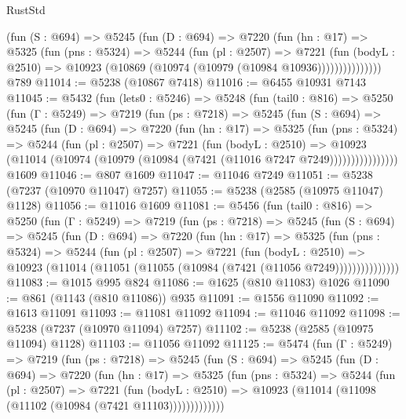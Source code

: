 \begin{lexlean}{RustStd}
\begin{coremodule}
              (fun (S : @694) =>
              @5245
                (fun (D : @694) =>
                @7220
                  (fun (hn : @17) =>
                  @5325
                    (fun (pns : @5324) =>
                    @5244
                      (fun (pl : @2507) =>
                      @7221
                        (fun (bodyL : @2510) =>
                        @10923 (@10869 (@10974 (@10979 (@10984 @10936)))))))))))))))
    @789
@11014 := @5238 (@10867 @7418)
@11016 := @6455 @10931 @7143
@11045 := @5432
    (fun (lets0 : @5246) =>
    @5248
      (fun (tail0 : @816) =>
      @5250
        (fun (Γ : @5249) =>
        @7219
          (fun (ps : @7218) =>
          @5245
            (fun (S : @694) =>
            @5245
              (fun (D : @694) =>
              @7220
                (fun (hn : @17) =>
                @5325
                  (fun (pns : @5324) =>
                  @5244
                    (fun (pl : @2507) =>
                    @7221
                      (fun (bodyL : @2510) =>
                      @10923
                        (@11014 (@10974 (@10979 (@10984 (@7421 (@11016 @7247 @7249))))))))))))))))
    @1609
@11046 := @807 @1609
@11047 := @11046 @7249
@11051 := @5238 (@7237 (@10970 @11047) @7257)
@11055 := @5238 (@2585 (@10975 @11047) @1128)
@11056 := @11016 @1609
@11081 := @5456
    (fun (tail0 : @816) =>
    @5250
      (fun (Γ : @5249) =>
      @7219
        (fun (ps : @7218) =>
        @5245
          (fun (S : @694) =>
          @5245
            (fun (D : @694) =>
            @7220
              (fun (hn : @17) =>
              @5325
                (fun (pns : @5324) =>
                @5244
                  (fun (pl : @2507) =>
                  @7221
                    (fun (bodyL : @2510) =>
                    @10923 (@11014 (@11051 (@11055 (@10984 (@7421 (@11056 @7249)))))))))))))))
@11083 := @1015 @995 @824
@11086 := @1625 (@810 @11083) @1026
@11090 := @861 (@1143 (@810 @11086)) @935
@11091 := @1556 @11090
@11092 := @1613 @11091
@11093 := @11081 @11092
@11094 := @11046 @11092
@11098 := @5238 (@7237 (@10970 @11094) @7257)
@11102 := @5238 (@2585 (@10975 @11094) @1128)
@11103 := @11056 @11092
@11125 := @5474
    (fun (Γ : @5249) =>
    @7219
      (fun (ps : @7218) =>
      @5245
        (fun (S : @694) =>
        @5245
          (fun (D : @694) =>
          @7220
            (fun (hn : @17) =>
            @5325
              (fun (pns : @5324) =>
              @5244
                (fun (pl : @2507) =>
                @7221
                  (fun (bodyL : @2510) =>
                  @10923 (@11014 (@11098 (@11102 (@10984 (@7421 @11103)))))))))))))

\end{coremodule}
\end{lexlean}
